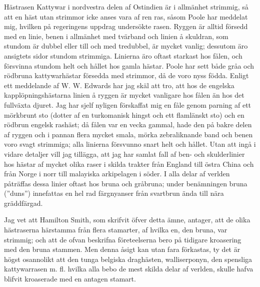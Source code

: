 Hästrasen Kattywar i nordvestra delen af Ostindien är i allmänhet strimmig, så att en häst utan strimmor icke anses vara af ren ras, såsom Poole har meddelat mig, hvilken på regeringens uppdrag undersökte rasen. Ryggen är alltid försedd med en linie, benen i allmänhet med tvärband och linien å skuldran, som stundom är dubbel eller till och med tredubbel, är mycket vanlig; dessutom äro ansigtets sidor stundom strimmiga. Linierna äro oftast starkast hos fålen, och försvinna stundom helt och hållet hos gamla hästar. Poole har sett både gråa och rödbruna kattywarhästar försedda med strimmor, då de voro nyss födda. Enligt ett meddelande af W. W. Edwards har jag skäl att tro, att hos de engelska kapplöpningshästarna linien å ryggen är mycket vanligare hos fålen än hos det fullväxta djuret. Jag har sjelf nyligen förskaffat mig en fåle genom parning af ett mörkbrunt sto (dotter af en turkomanisk hingst och ett flamlänskt sto) och en rödbrun engelsk rashäst; då fålen var en vecka gammal, hade den på bakre delen af ryggen och i pannan flera mycket smala, mörka zebraliknande band och benen voro svagt strimmiga; alla linierna försvunno snart helt och hållet. Utan att ingå i vidare detaljer vill jag tillägga, att jag har samlat fall af ben- och skulderlinier hos hästar af mycket olika raser i skilda trakter från England till östra China och från Norge i norr till malayiska arkipelagen i söder. I alla delar af verlden påträffas dessa linier oftast hos bruna och gråbruna; under benämningen bruna (”duns”) innefattas en hel rad färgnyanser från svartbrun ända till nära gräddfärgad.

Jag vet att Hamilton Smith, som skrifvit öfver detta ämne, antager, att de olika hästraserna härstamma från flera stamarter, af hvilka en, den bruna, var strimmig; och att de ofvan beskrifna företeelserna bero på tidigare kroasering med den bruna stammen. Men denna åsigt kan utan fara förkastas, ty det är högst osannolikt att den tunga belgiska draghästen, walliserponyn, den spensliga kattywarrasen m. fl. hvilka alla bebo de mest skilda delar af verlden, skulle hafva blifvit kroaserade med en antagen stamart.

